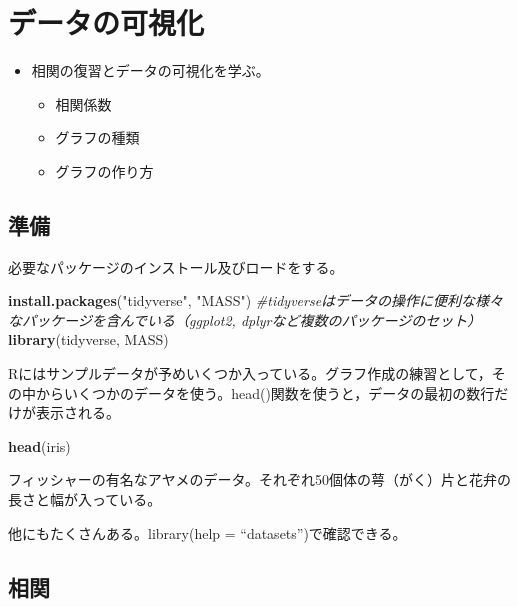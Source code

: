 \documentclass[]{article}
\newenvironment{Shaded}{\begin{snugshade}}{\end{snugshade}}
\newcommand{\KeywordTok}[1]{\textcolor[rgb]{0.13,0.29,0.53}{\textbf{#1}}}
\newcommand{\StringTok}[1]{\textcolor[rgb]{0.31,0.60,0.02}{#1}}
\newcommand{\CommentTok}[1]{\textcolor[rgb]{0.56,0.35,0.01}{\textit{#1}}}
\newcommand{\NormalTok}[1]{#1}
\providecommand{\tightlist}{%
  \setlength{\itemsep}{0pt}\setlength{\parskip}{0pt}}
\begin{document}
\section{データの可視化}

\begin{itemize}
\tightlist
\item
  相関の復習とデータの可視化を学ぶ。

  \begin{itemize}
  \tightlist
  \item
    相関係数
  \item
    グラフの種類
  \item
    グラフの作り方
  \end{itemize}
\end{itemize}

\subsection{準備}\label{-1}

必要なパッケージのインストール及びロードをする。

\begin{Shaded}
\begin{Highlighting}[]
\KeywordTok{install.packages}\NormalTok{(}\StringTok{"tidyverse"}\NormalTok{, }\StringTok{"MASS"}\NormalTok{) }\CommentTok{#tidyverseはデータの操作に便利な様々なパッケージを含んでいる（ggplot2, dplyrなど複数のパッケージのセット）}
\KeywordTok{library}\NormalTok{(tidyverse, MASS) }
\end{Highlighting}
\end{Shaded}

Rにはサンプルデータが予めいくつか入っている。グラフ作成の練習として，その中からいくつかのデータを使う。head()関数を使うと，データの最初の数行だけが表示される。

\begin{Shaded}
\begin{Highlighting}[]
\KeywordTok{head}\NormalTok{(iris)}
\end{Highlighting}
\end{Shaded}

フィッシャーの有名なアヤメのデータ。それぞれ50個体の萼（がく）片と花弁の長さと幅が入っている。

他にもたくさんある。library(help = ``datasets'')で確認できる。

\subsection{相関}
\end{document}
